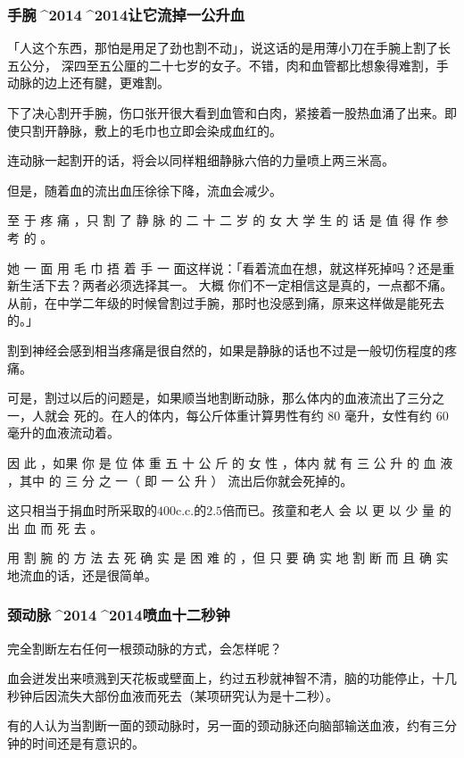 \documentclass[UTF8]{ctexart}
\begin{document}
\subsubsection{手腕^^^^2014^^^^2014让它流掉一公升血}

「人这个东西，那怕是用足了劲也割不动」，说这话的是用薄小刀在手腕上割了长五公分，
深四至五公厘的二十七岁的女子。不错，肉和血管都比想象得难割，手动脉的边上还有腱，更难割。

下了决心割开手腕，伤口张开很大看到血管和白肉，紧接着一股热血涌了出来。即使只割开静脉，敷上的毛巾也立即会染成血红的。

连动脉一起割开的话，将会以同样粗细静脉六倍的力量喷上两三米高。

但是，随着血的流出血压徐徐下降，流血会减少。 

至 于 疼 痛 ，只 割 了 静 脉 的 二 十 二 岁 的 女 大 学 生 的 话 是 值 得 作 参 考 的 。

她 一 面 用 毛 巾 捂 着 手 一 面这样说：「看着流血在想，就这样死掉吗？还是重新生活下去？两者必须选择其一。
大概 你们不一定相信这是真的，一点都不痛。从前，在中学二年级的时候曾割过手腕，那时也没感到痛，原来这样做是能死去的。」 

割到神经会感到相当疼痛是很自然的，如果是静脉的话也不过是一般切伤程度的疼痛。

可是，割过以后的问题是，如果顺当地割断动脉，那么体内的血液流出了三分之一，人就会 死的。在人的体内，每公斤体重计算男性有约 $80$ 毫升，女性有约 $60$ 毫升的血液流动着。

因 此 ，如果 你 是 位 体 重 五 十 公 斤 的 女 性 ，体内 就 有 三 公 升 的 血 液 ，其中 的 三 分 之 一（ 即 一 公 升 ） 流出后你就会死掉的。

这只相当于捐血时所采取的$400$c.c.的$2.5$倍而已。孩童和老人 会 以 更 以 少 量 的 出 血 而 死 去 。

用 割 腕 的 方 法 去 死 确 实 是 困 难 的 ，但 只 要 确 实 地 割 断 而 且 确 实 地流血的话，还是很简单。

\subsubsection{颈动脉^^^^2014^^^^2014喷血十二秒钟}

完全割断左右任何一根颈动脉的方式，会怎样呢？

血会迸发出来喷溅到天花板或壁面上，约过五秒就神智不清，脑的功能停止，十几秒钟后因流失大部份血液而死去（某项研究认为是十二秒）。

有的人认为当割断一面的颈动脉时，另一面的颈动脉还向脑部输送血液，约有三分钟的时间还是有意识的。
\end{document}
